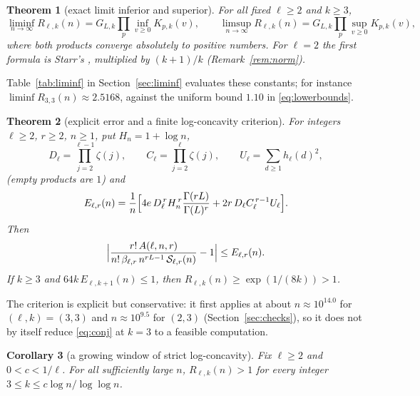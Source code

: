 \documentclass[11pt,a4paper]{article}
\newtheorem{theorem}{Theorem}[section]
\newtheorem{corollary}[theorem]{Corollary}
\theoremstyle{remark}
\numberwithin{equation}{section}
\newcommand{\Sing}{\mathcal S}
\begin{document}
\begin{theorem}[exact limit inferior and superior]\label{thm:liminf}
For all fixed $\ell\ge2$ and $k\ge3$,
\begin{equation}\label{eq:liminf}
\liminf_{n\to\infty}R_{\ell,k}(n)=G_{L,k}\prod_p\inf_{v\ge0}K_{p,k}(v),\qquad
\limsup_{n\to\infty}R_{\ell,k}(n)=G_{L,k}\prod_p\sup_{v\ge0}K_{p,k}(v),
\end{equation}
where both products converge absolutely to positive numbers. For $\ell=2$ the first formula is Starr's \cite[Corollary~2.4]{Starr2026a}, multiplied by $(k+1)/k$ (Remark~\ref{rem:norm}).
\end{theorem}
Table~\ref{tab:liminf} in Section~\ref{sec:liminf} evaluates these constants; for instance $\liminf R_{3,3}(n)\approx2.5168$, against the uniform bound $1.10$ in \eqref{eq:lowerbounds}.

\begin{theorem}[explicit error and a finite log-concavity criterion]\label{thm:explicit}
For integers $\ell\ge2$, $r\ge2$, $n\ge1$, put $H_n=1+\log n$,
\[
D_\ell=\prod_{j=2}^{\ell-1}\zeta(j),\qquad C_\ell=\prod_{j=2}^{\ell}\zeta(j),\qquad U_\ell=\sum_{d\ge1}h_\ell(d)^2,
\]
(empty products are $1$) and
\begin{equation}\label{eq:E}
E_{\ell,r}(n)=\frac1n\Bigl[4e\,D_\ell^{\,r}H_n^{\,r}\frac{\Gamma(rL)}{\Gamma(L)^r}+2r\,D_\ell C_\ell^{\,r-1}U_\ell\Bigr].
\end{equation}
Then
\begin{equation}\label{eq:explicit}
\Bigl|\frac{r!\,A(\ell,n,r)}{n!\,\beta_{\ell,r}\,n^{rL-1}\,\Sing_{\ell,r}(n)}-1\Bigr|\le E_{\ell,r}(n).
\end{equation}
If $k\ge3$ and $64k\,E_{\ell,k+1}(n)\le1$, then $R_{\ell,k}(n)\ge\exp(1/(8k))>1$.
\end{theorem}

The criterion is explicit but conservative: it first applies at about $n\approx10^{14.0}$ for $(\ell,k)=(3,3)$ and $n\approx10^{9.5}$ for $(2,3)$ (Section~\ref{sec:checks}), so it does not by itself reduce \eqref{eq:conj} at $k=3$ to a feasible computation.

\begin{corollary}[a growing window of strict log-concavity]\label{cor:window}
Fix $\ell\ge2$ and $0<c<1/\ell$. For all sufficiently large $n$, $R_{\ell,k}(n)>1$ for every integer $3\le k\le c\log n/\log\log n$.
\end{corollary}
\end{document}
